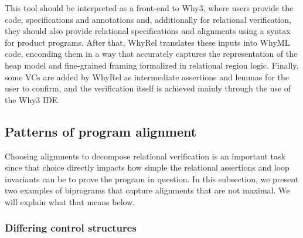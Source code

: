 This tool should be interpreted as a front-end to Why3, where users provide the code, specifications and annotations and, additionally for relational verification, they should also provide relational specifications and alignments using a syntax for product programs.
After that, WhyRel translates these inputs into WhyML code, enconding them in a way that accurately captures the representation of the heap model and fine-grained framing formalized in relational region logic.
Finally, some VCs are added by WhyRel as intermediate assertions and lemmas for the user to confirm, and the verification itself is achieved mainly through the use of the Why3 IDE.


\subsection{Patterns of program alignment}
\label{subsec:whyrel_patterns}

Choosing alignments to decompose relational verification is an important task since that choice directly impacts how simple the relational assertions and loop invariants can be to prove the program in question.
In this subsection, we present two examples of biprograms that capture alignments that are not maximal.
We will explain what that means below.


\subsubsection{Differing control structures}
\label{subsubsec:diff_control_structs}

